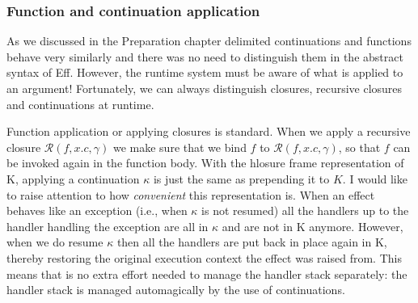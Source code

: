 \documentclass[class=article, crop=false]{standalone}
\begin{document}
\subsubsection{Function and continuation application}

As we discussed in the Preparation chapter delimited continuations and functions behave very similarly and there
was no need to distinguish them in the abstract syntax of Eff. However, the runtime system must be aware of what
is applied to an argument! Fortunately, we can always distinguish closures, recursive closures and continuations
at runtime.

Function application or applying closures is standard. When we apply a recursive closure $\mathcal{R}(f, x.c, \gamma)$
we make sure that we bind $f$ to $\mathcal{R}(f, x.c, \gamma)$, so that $f$ can be invoked again in the function body.
With the hlosure frame representation of K, applying a continuation $\kappa$ is just the same as prepending it to $K$.
I would like to raise attention to how \emph{convenient} this representation is. When an effect behaves like an exception (i.e., when $\kappa$ is not resumed)
all the handlers up to the handler handling the exception are all in $\kappa$ and are not in K anymore. However, when we do resume $\kappa$ then all
the handlers are put back in place again in K, thereby restoring the original execution context the effect was raised from.
This means that is no extra effort needed to manage the handler stack separately: the handler stack is managed automagically by the use of continuations.
\end{document}
